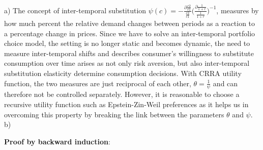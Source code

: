 \documentclass[12pt,a4paper]{article}
\begin{document}
a) The concept of inter-temporal substitution $\psi(c)=-\frac{\partial\frac{c2}{c1}}{\frac{c2}{c1}}\bigg(\frac{\partial\frac{1}{1+r}}{\frac{1}{1+r}}\bigg)^{-1}$, measures by how much percent the relative demand changes between periods as a reaction to a percentage change in prices. Since we have to solve an inter-temporal portfolio choice model, the setting is no longer static and becomes dynamic, the need to measure inter-temporal shifts and describes consumer's willingness to substitute consumption over time arises as not only risk aversion, but also inter-temporal substitution elasticity determine consumption decisions. With CRRA utility function, the two measures are just reciprocal of each other, $\theta=\frac{1}{\psi}$ and can therefore not be controlled separately. However, it is reasonable to choose a recursive utility function such as Epstein-Zin-Weil preferences as it helps us in overcoming this property by breaking the link between the parameters $\theta$ and $\psi$.    \\

b) 

\textbf{Proof by backward induction}:
\end{document}
